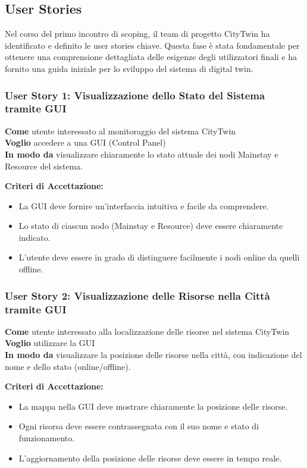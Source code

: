 \subsection{User Stories}

Nel corso del primo incontro di scoping, il team di progetto CityTwin ha identificato e definito le user stories chiave. Questa fase è stata fondamentale per ottenere una comprensione dettagliata delle esigenze degli utilizzatori finali e ha fornito una guida iniziale per lo sviluppo del sistema di digital twin.

\subsubsection{User Story 1: Visualizzazione dello Stato del Sistema tramite GUI}

\textbf{Come} utente interessato al monitoraggio del sistema CityTwin \\
\textbf{Voglio} accedere a una GUI (Control Panel) \\
\textbf{In modo da} visualizzare chiaramente lo stato attuale dei nodi Mainstay e Resource del sistema.

\textbf{Criteri di Accettazione:}
\begin{itemize}
    \item La GUI deve fornire un'interfaccia intuitiva e facile da comprendere.
    \item Lo stato di ciascun nodo (Mainstay e Resource) deve essere chiaramente indicato.
    \item L'utente deve essere in grado di distinguere facilmente i nodi online da quelli offline.
\end{itemize}

\subsubsection{User Story 2: Visualizzazione delle Risorse nella Città tramite GUI}

\textbf{Come} utente interessato alla localizzazione delle risorse nel sistema CityTwin \\
\textbf{Voglio} utilizzare la GUI \\
\textbf{In modo da} visualizzare la posizione delle risorse nella città, con indicazione del nome e dello stato (online/offline).

\textbf{Criteri di Accettazione:}
\begin{itemize}
    \item La mappa nella GUI deve mostrare chiaramente la posizione delle risorse.
    \item Ogni risorsa deve essere contrassegnata con il suo nome e stato di funzionamento.
    \item L'aggiornamento della posizione delle risorse deve essere in tempo reale.
\end{itemize}

